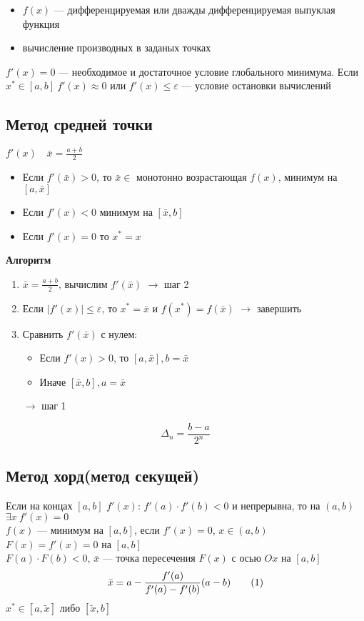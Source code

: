 \documentclass[english]{article}
\newcommand\addtag{\refstepcounter{equation}\tag{\theequation}}
\theoremstyle{plain}
\theoremstyle{remark}
\theoremstyle{definition}
\begin{document}
\begin{itemize}
\item \(f(x)\) --- дифференцируемая или дважды дифференцируемая выпуклая функция
\item вычисление производных в заданых точках
\end{itemize}

\(f'(x) = 0\) --- необходимое и достаточное условие глобального
минимума.  Если \(x^* \in [a, b]\ f'(x) \approx 0\) или \(f'(x) \le
\varepsilon\) --- условие остановки вычислений
\subsection{Метод средней точки}
\label{sec:orga5d4341}
\(f'(x)\quad \bar{x} = \frac{a + b}{2}\) \\
\begin{itemize}
\item Если \(f'(\bar{x}) > 0\), то \(\bar{x}\in\) монотонно возрастающая
\(f(x)\), минимум на \([a, \bar{x}]\)
\item Если \(f'(x) < 0\) минимум на \([\bar{x}, b]\)
\item Если \(f'(x) = 0\) то \(x^* = x\)
\end{itemize}

\textbf{Алгоритм}
\begin{enumerate}
\item \(\bar{x} = \frac{a + b}{2}\), вычислим \(f'(\bar{x})\) \(\rightarrow\) шаг
2
\item Если \(|f'(x)| \le \varepsilon\), то \(x^* = \bar{x}\) и \(f(x^*) =
   f(\bar{x})\) \(\rightarrow\) завершить
\item Сравнить \(f'(\bar{x})\) с нулем:
\begin{itemize}
\item Если \(f'(x) > 0\), то \([a, \bar{x}], b = \bar{x}\)
\item Иначе \([\bar{x}, b], a=\bar{x}\)
\end{itemize}
\(\rightarrow\) шаг 1
\end{enumerate}
\[ \Delta_n = \frac{b - a}{2^n} \]
\subsection{Метод хорд(метод секущей)}
\label{sec:org75e388a}
Если на концах \([a, b]\) \(f'(x)\): \(f'(a)\cdot f'(b) < 0\) и непрерывна,
то на \((a, b)\) \(\exists x\ f'(x) = 0\) \\
\(f(x)\) --- минимум на \([a, b]\), если \(f'(x) = 0\), \(x\in(a, b)\) \\
\(F(x) = f'(x) = 0\) на \([a, b]\) \\
\(F(a)\cdot F(b) < 0\), \(\bar{x}\) --- точка пересечения \(F(x)\) с осью \(Ox\) на \([a, b]\)
\[ \bar{x} = a - \frac{f'(a)}{f'(a) - f'(b)}(a - b) \label{hord_1_4}\addtag\]
\(x^* \in [a, \tilde{x}]\) либо \([\tilde{x}, b]\)
\end{document}
